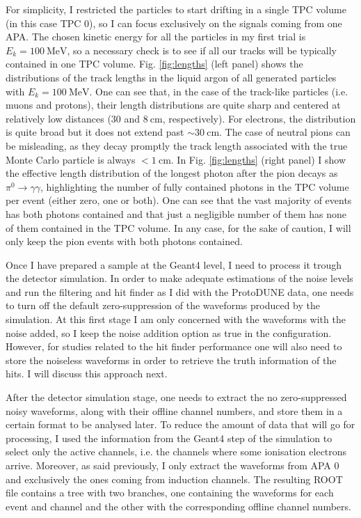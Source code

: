 For simplicity, I restricted the particles to start drifting in a single TPC volume (in this case TPC 0), so I can focus exclusively on the signals coming from one APA. The chosen kinetic energy for all the particles in my first trial is $E_{k} = 100 \ \mathrm{MeV}$, so a necessary check is to see if all our tracks will be typically contained in one TPC volume. Fig. \ref{fig:lengths} (left panel) shows the distributions of the track lengths in the liquid argon of all generated particles with $E_{k} = 100 \ \mathrm{MeV}$. One can see that, in the case of the track-like particles (i.e. muons and protons), their length distributions are quite sharp and centered at relatively low distances ($30$ and $8 \ \mathrm{cm}$, respectively). For electrons, the distribution is quite broad but it does not extend past $\sim 30 \ \mathrm{cm}$. The case of neutral pions can be misleading, as they decay promptly the track length associated with the true Monte Carlo particle is always $< 1 \ \mathrm{cm}$. In Fig. \ref{fig:lengths} (right panel) I show the effective length distribution of the longest photon after the pion decays as $\pi^{0} \rightarrow \gamma \gamma$, highlighting the number of fully contained photons in the TPC volume per event (either zero, one or both). One can see that the vast majority of events has both photons contained and that just a negligible number of them has none of them contained in the TPC volume. In any case, for the sake of caution, I will only keep the pion events with both photons contained.

Once I have prepared a sample at the Geant4 level, I need to process it trough the detector simulation. In order to make adequate estimations of the noise levels and run the filtering and hit finder as I did with the ProtoDUNE data, one needs to turn off the default zero-suppression of the waveforms produced by the simulation. At this first stage I am only concerned with the waveforms with the noise added, so I keep the noise addition option as true in the configuration. However, for studies related to the hit finder performance one will also need to store the noiseless waveforms in order to retrieve the truth information of the hits. I will discuss this approach next.

After the detector simulation stage, one needs to extract the no zero-suppressed noisy waveforms, along with their offline channel numbers, and store them in a certain format to be analysed later. To reduce the amount of data that will go for processing, I used the information from the Geant4 step of the simulation to select only the active channels, i.e. the channels where some ionisation electrons arrive. Moreover, as said previously, I only extract the waveforms from APA $0$ and exclusively the ones coming from induction channels. The resulting ROOT file contains a tree with two branches, one containing the waveforms for each event and channel and the other with the corresponding offline channel numbers.

